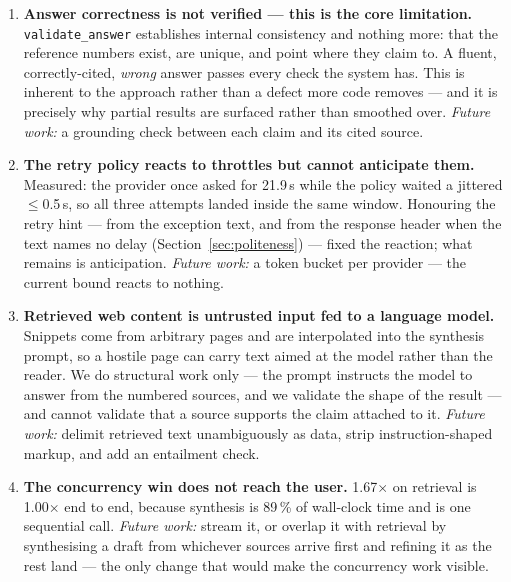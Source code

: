 \documentclass[10pt,a4paper]{article}
\begin{document}
\begin{enumerate}[leftmargin=1.6em,itemsep=0.15em]
  \item \textbf{Answer correctness is not verified --- this is the core limitation.}
        \texttt{validate\_answer} establishes internal consistency and nothing more: that the
        reference numbers exist, are unique, and point where they claim to. A fluent,
        correctly-cited, \emph{wrong} answer passes every check the system has. This is inherent
        to the approach rather than a defect more code removes --- and it is precisely why
        partial results are surfaced rather than smoothed over. \emph{Future work:} a grounding
        check between each claim and its cited source.

  \item \textbf{The retry policy reacts to throttles but cannot anticipate them.} Measured: the
        provider once asked for 21.9\,s while the policy waited a jittered $\leq$0.5\,s, so all
        three attempts landed inside the same window. Honouring the retry hint --- from the
        exception text, and from the response header when the text names no delay
        (Section~\ref{sec:politeness}) --- fixed the reaction; what remains is anticipation.
        \emph{Future work:} a token bucket per provider --- the current bound reacts to nothing.

  \item \textbf{Retrieved web content is untrusted input fed to a language model.} Snippets come
        from arbitrary pages and are interpolated into the synthesis prompt, so a hostile page
        can carry text aimed at the model rather than the reader. We do structural work only ---
        the prompt instructs the model to answer from the numbered sources, and we validate the
        shape of the result --- and cannot validate that a source supports the claim attached to
        it. \emph{Future work:} delimit retrieved text unambiguously as data, strip
        instruction-shaped markup, and add an entailment check.

  \item \textbf{The concurrency win does not reach the user.} 1.67$\times$ on retrieval is
        1.00$\times$ end to end, because synthesis is 89\,\% of wall-clock time and is one
        sequential call. \emph{Future work:} stream it, or overlap it with retrieval by
        synthesising a draft from whichever sources arrive first and refining it as the rest land
        --- the only change that would make the concurrency work visible.


\end{enumerate}
\end{document}

